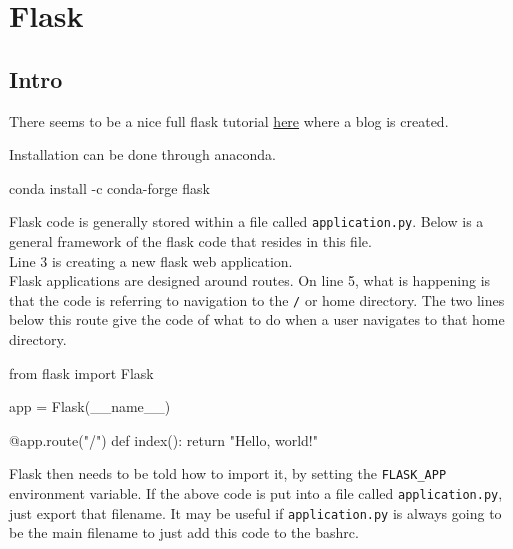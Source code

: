 \documentclass[]{book}
\newenvironment{Shaded}{\begin{snugshade}}{\end{snugshade}}
\newcommand{\StringTok}[1]{\textcolor[rgb]{0.31,0.60,0.02}{#1}}
\newcommand{\BuiltInTok}[1]{#1}
\newcommand{\ExtensionTok}[1]{#1}
\newcommand{\NormalTok}[1]{#1}
\begin{document}
\chapter{Flask}\label{flask}

\section{Intro}\label{intro-1}

There seems to be a nice full flask tutorial
\href{https://blog.miguelgrinberg.com/post/the-flask-mega-tutorial-part-i-hello-world}{here}
where a blog is created.

Installation can be done through anaconda.

\begin{Shaded}
\begin{Highlighting}[]
\ExtensionTok{conda}\NormalTok{ install -c conda-forge flask}
\end{Highlighting}
\end{Shaded}

Flask code is generally stored within a file called
\texttt{application.py}. Below is a general framework of the flask code
that resides in this file.\\
Line 3 is creating a new flask web application.\\
Flask applications are designed around routes. On line 5, what is
happening is that the code is referring to navigation to the \texttt{/}
or home directory. The two lines below this route give the code of what
to do when a user navigates to that home directory.

\begin{Shaded}
\begin{Highlighting}[]
\ExtensionTok{from}\NormalTok{ flask import Flask   }
                          
\ExtensionTok{app}\NormalTok{ = Flask(__name__)     }
                          
\ExtensionTok{@app.route}\NormalTok{(}\StringTok{"/"}\NormalTok{)           }
\ExtensionTok{def}\NormalTok{ index()}\BuiltInTok{:}              
    \BuiltInTok{return} \StringTok{"Hello, world!"}
\end{Highlighting}
\end{Shaded}

Flask then needs to be told how to import it, by setting the
\texttt{FLASK\_APP} environment variable. If the above code is put into
a file called \texttt{application.py}, just export that filename. It may
be useful if \texttt{application.py} is always going to be the main
filename to just add this code to the bashrc.
\end{document}
